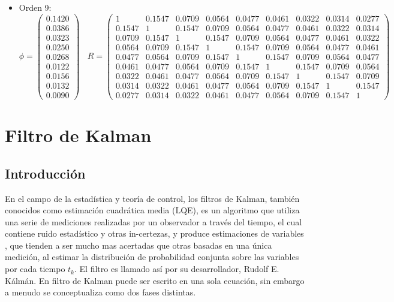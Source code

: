 \begin{itemize}
\item Orden 9:
\begin{equation*}
	\phi = 
	\begin{pmatrix}
		0.1420 \\
		0.0386 \\
		0.0323 \\
		0.0250 \\
		0.0268 \\
		0.0122 \\
		0.0156 \\
		0.0132 \\
		0.0090
	\end{pmatrix}	\	\	\	\
	R =
	\begin{pmatrix}	
	1 & 0.1547 & 0.0709 & 0.0564 & 0.0477 & 0.0461 & 0.0322 & 0.0314 & 0.0277 \\
	0.1547 & 1 & 0.1547 & 0.0709 & 0.0564 & 0.0477 & 0.0461 & 0.0322 & 0.0314 \\
	0.0709 & 0.1547 & 1 & 0.1547 & 0.0709 & 0.0564 & 0.0477 & 0.0461 & 0.0322 \\
	0.0564 & 0.0709 & 0.1547 & 1 & 0.1547 & 0.0709 & 0.0564 & 0.0477 & 0.0461 \\
	0.0477 & 0.0564 & 0.0709 & 0.1547 & 1 & 0.1547 & 0.0709 & 0.0564 & 0.0477 \\
	0.0461 & 0.0477 & 0.0564 & 0.0709 & 0.1547 & 1 & 0.1547 & 0.0709 & 0.0564 \\
	0.0322 & 0.0461 & 0.0477 & 0.0564 & 0.0709 & 0.1547 & 1 & 0.1547 & 0.0709 \\
	0.0314 & 0.0322 & 0.0461 & 0.0477 & 0.0564 & 0.0709 & 0.1547 & 1 & 0.1547 \\
	0.0277 & 0.0314 & 0.0322 & 0.0461 & 0.0477 & 0.0564 & 0.0709 & 0.1547 & 1	  
	\end{pmatrix}
\end{equation*}

\end{itemize}

\section{Filtro de Kalman}

\subsection{Introducción}
En el campo de la estadística y teoría de control, los filtros de Kalman, también conocidos como estimación cuadrática media (LQE), es un algoritmo que utiliza una serie de mediciones realizadas por un observador a través del tiempo, el cual contiene ruido estadístico y otras in-certezas, y  produce estimaciones de variables , que tienden a ser mucho mas acertadas que otras basadas en una única medición, al estimar la distribución de probabilidad conjunta sobre las variables por cada tiempo $t_k$. El filtro es llamado así por su desarrollador, Rudolf E. Kálmán.
En filtro de Kalman puede ser escrito en una sola ecuación, sin embargo a menudo se conceptualiza como dos fases distintas.

